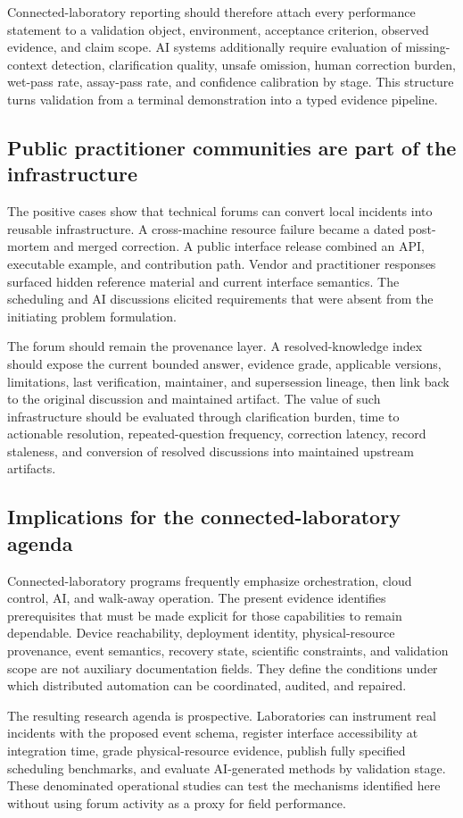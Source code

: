 Connected-laboratory reporting should therefore attach every performance statement to a validation object, environment, acceptance criterion, observed evidence, and claim scope. AI systems additionally require evaluation of missing-context detection, clarification quality, unsafe omission, human correction burden, wet-pass rate, assay-pass rate, and confidence calibration by stage. This structure turns validation from a terminal demonstration into a typed evidence pipeline.

\subsection{Public practitioner communities are part of the infrastructure}

The positive cases show that technical forums can convert local incidents into reusable infrastructure. A cross-machine resource failure became a dated post-mortem and merged correction. A public interface release combined an API, executable example, and contribution path. Vendor and practitioner responses surfaced hidden reference material and current interface semantics. The scheduling and AI discussions elicited requirements that were absent from the initiating problem formulation.

The forum should remain the provenance layer. A resolved-knowledge index should expose the current bounded answer, evidence grade, applicable versions, limitations, last verification, maintainer, and supersession lineage, then link back to the original discussion and maintained artifact. The value of such infrastructure should be evaluated through clarification burden, time to actionable resolution, repeated-question frequency, correction latency, record staleness, and conversion of resolved discussions into maintained upstream artifacts.

\subsection{Implications for the connected-laboratory agenda}

Connected-laboratory programs frequently emphasize orchestration, cloud control, AI, and walk-away operation. The present evidence identifies prerequisites that must be made explicit for those capabilities to remain dependable. Device reachability, deployment identity, physical-resource provenance, event semantics, recovery state, scientific constraints, and validation scope are not auxiliary documentation fields. They define the conditions under which distributed automation can be coordinated, audited, and repaired.

The resulting research agenda is prospective. Laboratories can instrument real incidents with the proposed event schema, register interface accessibility at integration time, grade physical-resource evidence, publish fully specified scheduling benchmarks, and evaluate AI-generated methods by validation stage. These denominated operational studies can test the mechanisms identified here without using forum activity as a proxy for field performance.
